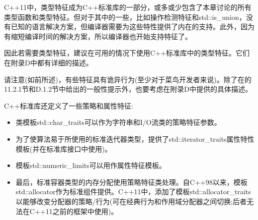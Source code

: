 C++11中，类型特征成为C++标准库的一部分，或多或少包含了本章讨论的所有类型函数和类型特征。但对于其中的一些，比如操作检测特征和std::is\_union，没有已知的语言解决方案，但编译器需要为这些特性提供了内在的支持。此外，因为有缩短编译时间的解决方案，所以编译器也开始支持特征了。

因此若需要类型特征，建议在可用的情况下使用C++标准库中的类型特征。它们在附录D中都有详细的描述。

请注意(如前所述)，有些特征具有诡异行为(至少对于菜鸟开发者来说)。除了在的11.2.1节和D.1.2节中给出的一般性提示外，也要考虑在附录D中提供的具体描述。

C++标准库还定义了一些策略和属性特征:

\begin{itemize}
\item 
类模板std::char\_traits可以作为字符串和I/O流类的策略特征参数。

\item 
为了使算法易于所使用的标准迭代器类型，提供了std::iterator\_traits属性特性模板(并在标准库接口中使用)。

\item 
模板std::numeric\_limits可以用作属性特征模板。

\item 
最后，标准容器类型的内存分配使用策略特征类处理。自C++98以来，模板std::allocator作为标准组件提供。C++11中，添加了模板std::allocator\_traits以能够改变分配器的策略/行为(可在经典行为和作用域分配器之间切换;后者无法在C++11之前的框架中使用)。
\end{itemize}



































